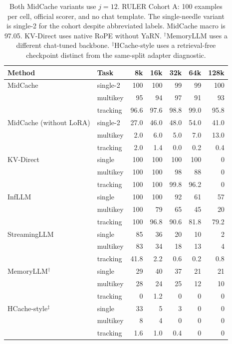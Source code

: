 \begin{table}[htbp]
\centering
\small
\setlength{\tabcolsep}{4pt}
\begin{tabular}{@{}llrrrrr@{}}
\toprule
Method & Task & 8k & 16k & 32k & 64k & 128k \\
\midrule
MidCache & single-2 & 100 & 100 & 99 & 99 & 100 \\
 & multikey & 95 & 94 & 97 & 91 & 93 \\
 & tracking & 96.6 & 97.6 & 98.8 & 99.0 & 95.8 \\
\midrule
MidCache (without LoRA) & single-2 & 27.0 & 46.0 & 48.0 & 54.0 & 41.0 \\
 & multikey & 2.0 & 6.0 & 5.0 & 7.0 & 13.0 \\
 & tracking & 2.0 & 1.4 & 0.0 & 0.2 & 0.4 \\
\midrule
KV-Direct & single & 100 & 100 & 100 & 100 & 0 \\
 & multikey & 100 & 100 & 98 & 88 & 0 \\
 & tracking & 100 & 100 & 99.8 & 96.2 & 0 \\
\midrule
InfLLM & single & 100 & 100 & 92 & 61 & 57 \\
 & multikey & 100 & 79 & 65 & 45 & 20 \\
 & tracking & 100 & 96.8 & 90.6 & 81.8 & 79.2 \\
\midrule
StreamingLLM & single & 85 & 36 & 20 & 10 & 2 \\
 & multikey & 83 & 34 & 18 & 13 & 4 \\
 & tracking & 41.8 & 2.2 & 0.6 & 0.2 & 0.8 \\
\midrule
MemoryLLM$^\dagger$ & single & 29 & 40 & 37 & 21 & 21 \\
 & multikey & 28 & 24 & 25 & 12 & 10 \\
 & tracking & 0 & 1.2 & 0 & 0 & 0 \\
\midrule
HCache-style$^{\ddagger}$ & single & 33 & 5 & 3 & 0 & 0 \\
 & multikey & 8 & 4 & 0 & 0 & 0 \\
 & tracking & 1.6 & 1.0 & 0.4 & 0 & 0 \\
\bottomrule
\end{tabular}
\caption{Both MidCache variants use $j=12$. RULER Cohort A: 100 examples per cell, official scorer, and no chat template. The single-needle variant is single-2 for the cohort despite abbreviated labels. MidCache macro is 97.05. KV-Direct uses native RoPE without YaRN. $^\dagger$MemoryLLM uses a different chat-tuned backbone. $^{\ddagger}$HCache-style uses a retrieval-free checkpoint distinct from the same-split adapter diagnostic.}
\label{tab:ruler-a}
\end{table}
